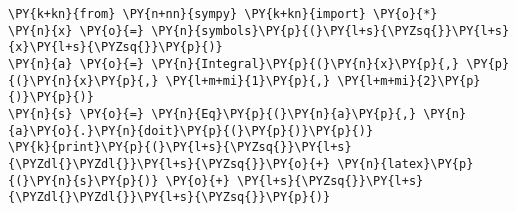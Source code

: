 \begin{Verbatim}[commandchars=\\\{\}]
\PY{k+kn}{from} \PY{n+nn}{sympy} \PY{k+kn}{import} \PY{o}{*}
\PY{n}{x} \PY{o}{=} \PY{n}{symbols}\PY{p}{(}\PY{l+s}{\PYZsq{}}\PY{l+s}{x}\PY{l+s}{\PYZsq{}}\PY{p}{)}
\PY{n}{a} \PY{o}{=} \PY{n}{Integral}\PY{p}{(}\PY{n}{x}\PY{p}{,} \PY{p}{(}\PY{n}{x}\PY{p}{,} \PY{l+m+mi}{1}\PY{p}{,} \PY{l+m+mi}{2}\PY{p}{)}\PY{p}{)}
\PY{n}{s} \PY{o}{=} \PY{n}{Eq}\PY{p}{(}\PY{n}{a}\PY{p}{,} \PY{n}{a}\PY{o}{.}\PY{n}{doit}\PY{p}{(}\PY{p}{)}\PY{p}{)}
\PY{k}{print}\PY{p}{(}\PY{l+s}{\PYZsq{}}\PY{l+s}{\PYZdl{}\PYZdl{}}\PY{l+s}{\PYZsq{}}\PY{o}{+} \PY{n}{latex}\PY{p}{(}\PY{n}{s}\PY{p}{)} \PY{o}{+} \PY{l+s}{\PYZsq{}}\PY{l+s}{\PYZdl{}\PYZdl{}}\PY{l+s}{\PYZsq{}}\PY{p}{)}
\end{Verbatim}
